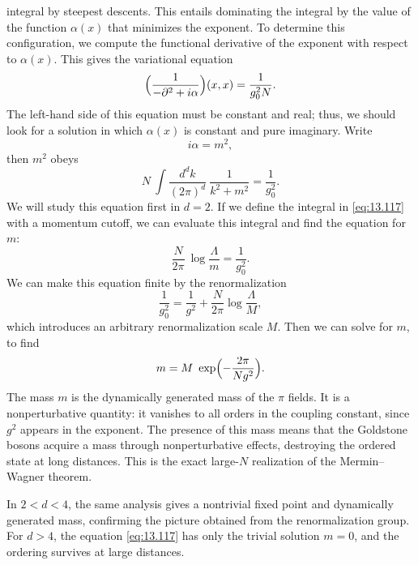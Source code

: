 integral by steepest descents.  This entails dominating the integral by the
value of the function $\alpha(x)$ that minimizes the exponent.  To determine
this configuration, we compute the functional derivative of the exponent with
respect to $\alpha(x)$.  This gives the variational equation
\begin{equation}
  \Bigl( \frac{1}{-\partial^2 + i\alpha} \Bigr)(x,x) = \frac{1}{g_0^2N} .
  \label{eq:13.115}
\end{equation}
The left-hand side of this equation must be constant and real; thus, we should
look for a solution in which $\alpha(x)$ is constant and pure imaginary.
Write
\begin{equation}
  i\alpha = m^2 ,
  \label{eq:13.116}
\end{equation}
then $m^2$ obeys
\begin{equation}
  N\ \int \frac{d^dk}{(2\pi)^d}\ \frac{1}{k^2 + m^2}
  = \frac{1}{g_0^2} .
  \label{eq:13.117}
\end{equation}
We will study this equation first in $d = 2$.  If we define the integral in
\eqref{eq:13.117} with a momentum cutoff, we can evaluate this integral and
find the equation for $m$:
\begin{equation}
  \frac{N}{2\pi}\ \log\frac{\Lambda}{m} = \frac{1}{g_0^2} .
  \label{eq:13.118}
\end{equation}
We can make this equation finite by the renormalization
\begin{equation}
  \frac{1}{g_0^2} = \frac{1}{g^2} + \frac{N}{2\pi}\log\frac{\Lambda}{M} ,
  \label{eq:13.119}
\end{equation}
which introduces an arbitrary renormalization scale $M$.  Then we can solve
for $m$, to find
\begin{equation}
  m = M\ \exp\Bigl( -\frac{2\pi}{N g^2} \Bigr) .
  \label{eq:13.120}
\end{equation}
The mass $m$ is the dynamically generated mass of the $\pi$ fields.  It is a
nonperturbative quantity: it vanishes to all orders in the coupling constant,
since $g^2$ appears in the exponent.  The presence of this mass means that the
Goldstone bosons acquire a mass through nonperturbative effects, destroying
the ordered state at long distances.  This is the exact large-$N$ realization
of the Mermin--Wagner theorem.

In $2 < d < 4$, the same analysis gives a nontrivial fixed point and
dynamically generated mass, confirming the picture obtained from the
renormalization group.  For $d > 4$, the equation \eqref{eq:13.117} has only
the trivial solution $m = 0$, and the ordering survives at large distances.

